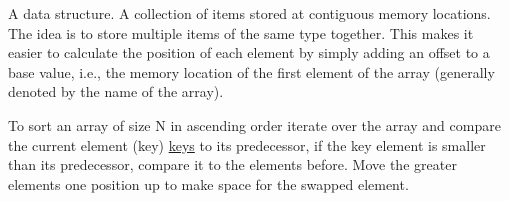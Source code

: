   \begin{definition}[Arrays]\label{def:arrays_1}
      A data structure. A collection of items stored at contiguous memory locations. The idea is to store multiple items of the same type together. This makes it easier to calculate the position of each element by simply adding an offset to a base value, i.e., the memory location of the first element of the array (generally denoted by the name of the array).
  \end{definition}

\begin{eg}
To sort an array of size N in ascending order iterate over the array and compare the current element (key) \hyperref[def:keys_1]{keys} to its predecessor, if the key element is smaller than its predecessor, compare it to the elements before. Move the greater elements one position up to make space for the swapped element.
\end{eg}

